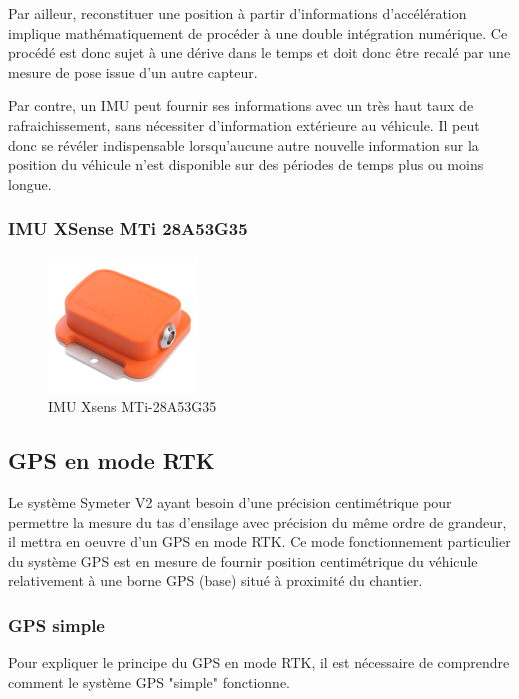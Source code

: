 \documentclass[12pt,a4paper]{report}
\begin{document}
		\para Par ailleur, reconstituer une position à partir d'informations d'accélération implique mathématiquement de procéder à une double intégration numérique. Ce procédé est donc sujet à une dérive dans le temps et doit donc être recalé par une mesure de pose issue d'un autre capteur.
		
		\para Par contre, un IMU peut fournir ses informations avec un très haut taux de rafraichissement, sans nécessiter d'information extérieure au véhicule. Il peut donc se révéler indispensable lorsqu'aucune autre nouvelle information sur la position du véhicule n'est disponible sur des périodes de temps plus ou moins longue.
		
		\subsubsection{IMU XSense MTi 28A53G35}
		
		\begin{figure}[h!]
			\centering
			\includegraphics[width=0.3\linewidth]{img/150px-Mti}
			\caption[mti]{IMU Xsens MTi-28A53G35}
			\label{fig:150px-mti}
		\end{figure}
		
		
		\subsection{GPS en mode RTK}
		
		Le système Symeter V2 ayant besoin d'une précision centimétrique pour permettre la mesure du tas d'ensilage avec précision du même ordre de grandeur, il mettra en oeuvre d'un GPS en mode RTK. Ce mode fonctionnement particulier du système GPS est en mesure de fournir position centimétrique du véhicule relativement à une borne GPS (base) situé à proximité du chantier.
		
		\subsubsection{GPS simple}
		Pour expliquer le principe du GPS en mode RTK, il est nécessaire de comprendre comment le système GPS "simple" fonctionne. 
		
\end{document}
